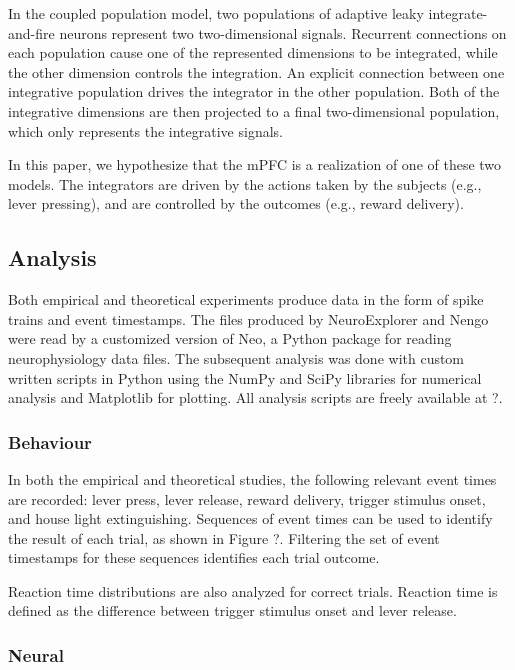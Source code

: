 \documentclass[12pt]{article}
\begin{document}
In the coupled population model, two populations of
adaptive leaky integrate-and-fire neurons represent
two two-dimensional signals.
Recurrent connections on each population cause
one of the represented dimensions to be integrated,
while the other dimension controls the integration.
An explicit connection between one integrative population
drives the integrator in the other population.
Both of the integrative dimensions are then
projected to a final two-dimensional population,
which only represents the integrative signals.

In this paper, we hypothesize that the mPFC
is a realization of one of these two models.
The integrators are driven by the actions taken by the subjects
(e.g., lever pressing),
and are controlled by the outcomes
(e.g., reward delivery).

\subsection{Analysis}

Both empirical and theoretical experiments
produce data in the form of spike trains
and event timestamps.
The files produced by NeuroExplorer and Nengo
were read by a customized version of Neo,
a Python package for reading neurophysiology data files.
The subsequent analysis was done
with custom written scripts in Python
using the NumPy and SciPy libraries for numerical analysis
and Matplotlib for plotting.
All analysis scripts are freely available
at ?. %

\subsubsection{Behaviour}

In both the empirical and theoretical studies,
the following relevant event times are recorded:
lever press, lever release, reward delivery,
trigger stimulus onset, and house light extinguishing.
Sequences of event times can be used to
identify the result of each trial,
as shown in Figure ?.
Filtering the set of event timestamps
for these sequences identifies each trial outcome.

Reaction time distributions are also analyzed
for correct trials.
Reaction time is defined as the difference between
trigger stimulus onset and lever release.

\subsubsection{Neural}
\end{document}
